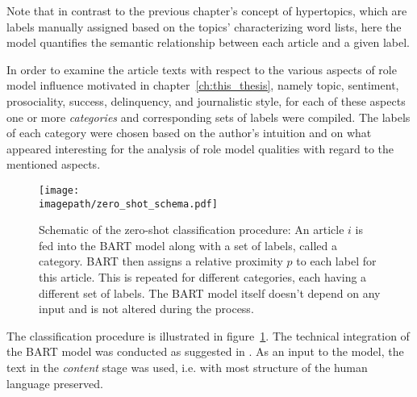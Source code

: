 Note that in contrast to the previous chapter's concept of hypertopics, which are labels manually assigned based on the topics' characterizing word lists, here the model quantifies the semantic relationship between each article and a given label.

In order to examine the article texts with respect to the various aspects of role model influence motivated in chapter~\ref{ch:this_thesis}, namely topic, sentiment, prosociality, success, delinquency, and journalistic style, for each of these aspects one or more \textit{categories} and corresponding sets of labels were compiled. The labels of each category were chosen based on the author's intuition and on what appeared interesting for the analysis of role model qualities with regard to the mentioned aspects.

\begin{figure}
    \centering
    \texttt{[image: \\imagepath/zero\_shot\_schema.pdf]}
    \caption{Schematic of the zero-shot classification procedure: An article $i$ is fed into the BART model along with a set of labels, called a category. BART then assigns a relative proximity $p$ to each label for this article. This is repeated for different categories, each having a different set of labels. The BART model itself doesn't depend on any input and is not altered during the process.}\label{fig:zero_shot_schema}
\end{figure}

The classification procedure is illustrated in figure~\ref{fig:zero_shot_schema}. The technical integration of the BART model was conducted as suggested in \textcite{huggingfacebart-large-mnli_facebookbart-large-mnli_nodate}. As an input to the model, the text in the \textit{content} stage was used, i.e. with most structure of the human language preserved.

